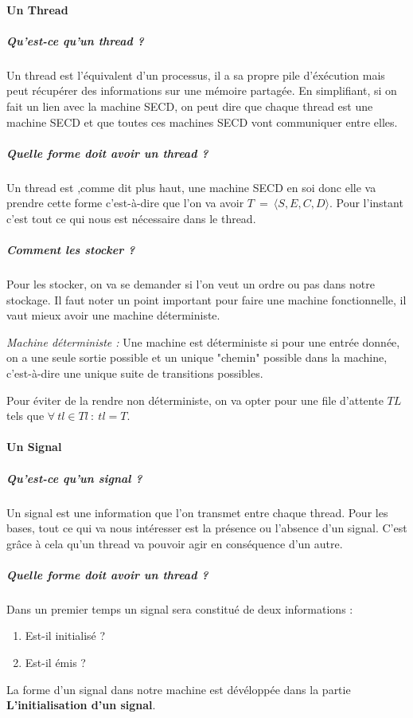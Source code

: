 \documentclass[10pt,a4paper]{report}
\begin{document}
\paragraph{Un Thread}

\subparagraph{Qu'est-ce qu'un thread ?}
Un thread est l'équivalent d'un processus, il a sa propre pile d'éxécution mais peut récupérer des informations sur une mémoire partagée. En simplifiant, si on fait un lien avec la machine SECD, on peut dire que chaque thread est une machine SECD et que toutes ces machines SECD vont communiquer entre elles.

\subparagraph{Quelle forme doit avoir un thread ?} 
Un thread est ,comme dit plus haut, une machine SECD en soi donc elle va prendre cette forme c'est-à-dire que l'on va avoir $T~=~\langle S,E,C,D\rangle$. Pour l'instant c'est tout ce qui nous est nécessaire dans le thread.

\subparagraph{Comment les stocker ?}
Pour les stocker, on va se demander si l'on veut un ordre ou pas dans notre stockage. Il faut noter un point important pour faire une machine fonctionnelle, il vaut mieux avoir une machine déterministe.
\medbreak

\textit{Machine déterministe :} Une machine est déterministe si pour une entrée donnée, on a une seule sortie possible et un unique "chemin" possible dans la machine, c'est-à-dire une unique suite de transitions possibles.
\medbreak

Pour éviter de la rendre non déterministe, on va opter pour une file d'attente $TL$ tels que $\forall~tl \in Tl~:~tl = T$.
\bigbreak

\paragraph{Un Signal} 

\subparagraph{Qu'est-ce qu'un signal ?}
Un signal est une information que l'on transmet entre chaque thread. Pour les bases, tout ce qui va nous intéresser est la présence ou l'absence d'un signal. C'est grâce à cela qu'un thread va pouvoir agir en conséquence d'un autre. 

\subparagraph{Quelle forme doit avoir un thread ?} 
Dans un premier temps un signal sera constitué de deux informations : 
\begin{enumerate}
\item Est-il initialisé ?
\item Est-il émis ?
\end{enumerate}
La forme d'un signal dans notre machine est dévéloppée dans la partie \textbf{L'initialisation d'un signal}.
\end{document}
